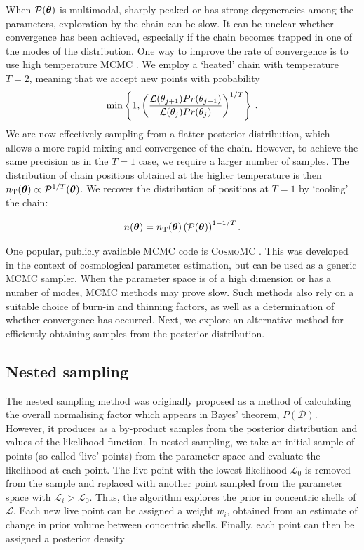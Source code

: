 When $\mathcal{P}(\boldsymbol\theta)$ is multimodal, sharply peaked or has strong degeneracies among the parameters, exploration by the chain can be slow. It can be unclear whether convergence has been achieved, especially if the chain becomes trapped in one of the modes of the distribution. One way to improve the rate of convergence is to use high temperature MCMC \cite{Kirkpatrick:1983,Lewis:2009}. We employ a `heated' chain with temperature $T = 2$, meaning that we accept new points with probability
\begin{equation}
\textrm{min}\left\{1, \left(\frac{\mathcal{L}(\bold\theta_{j+1})Pr(\bold\theta_{j+1})}{\mathcal{L}(\bold\theta_{j})Pr(\bold\theta_{j})}\right)^{1/T} \right\}\,.
\end{equation}
We are now effectively sampling from a flatter posterior distribution, which allows a more rapid mixing and convergence of the chain. However, to achieve the same precision as in the $T=1$ case, we require a larger number of samples. The distribution of chain positions obtained at the higher temperature is then \(n_\textrm{T}(\boldsymbol\theta) \propto \mathcal{P}^{1/T}(\boldsymbol\theta)\). We recover the distribution of positions at \(T=1\) by `cooling' the chain:

\begin{equation}
n(\boldsymbol\theta) = n_\textrm{T}(\boldsymbol\theta) \left(\mathcal{P}(\boldsymbol\theta)\right)^{1 - 1/T}.
\end{equation}


One popular, publicly available MCMC code is \textsc{CosmoMC} \cite{Lewis:2002}. This was developed in the context of cosmological parameter estimation, but can be used as a generic MCMC sampler.  When the parameter space is of a high dimension or has a number of modes, MCMC methods may prove slow. Such methods also rely on a suitable choice of burn-in and thinning factors, as well as a determination of whether convergence has occurred. Next, we explore an alternative method for efficiently obtaining samples from the posterior distribution.

\subsection{Nested sampling}

The nested sampling method \cite{Skilling:2004} was originally proposed as a method of calculating the overall normalising factor which appears in Bayes' theorem, $P(\mathcal{D})$. However, it produces as a by-product samples from the posterior distribution and values of the likelihood function. In nested sampling, we take an initial sample of points (so-called `live' points) from the parameter space and evaluate the likelihood at each point. The live point with the lowest likelihood $\mathcal{L}_0$ is removed from the sample and replaced with another point sampled from the parameter space with $\mathcal{L}_i > \mathcal{L}_0$. Thus, the algorithm explores the prior in concentric shells of $\mathcal{L}$. Each new live point can be assigned a weight $w_i$, obtained from an estimate of change in prior volume between concentric shells. Finally, each point can then be assigned a posterior density

